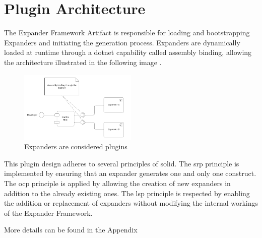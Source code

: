 \section{Plugin Architecture} \label{subsec_plugin_architecture}

The Expander Framework Artifact is responsible for loading and bootstrapping Expanders and
initiating the generation process. Expanders are dynamically loaded at runtime through a
dotnet capability called assembly binding, allowing the architecture illustrated in the
following image \parencite{koks_expanderpluginloaderinteractor_2023}.

\begin{figure}[H]
  \centering
  \includegraphics[width=0.5\textwidth]{figures/plugin_architecture.pdf}
  \caption[Plugin Archticture]{Expanders are considered plugins}
  \label{fi:plugin_architecture}
\end{figure}

This plugin design adheres to several principles of \gls{solid}. The \gls{srp} principle
is implemented by ensuring that an expander generates one and only one construct. The
\gls{ocp} principle is applied by allowing the creation of new expanders in addition to
the already existing ones. The \gls{lsp} principle is respected by enabling the addition
or replacement of expanders without modifying the internal workings of the Expander
Framework.

More details can be found in the Appendix 